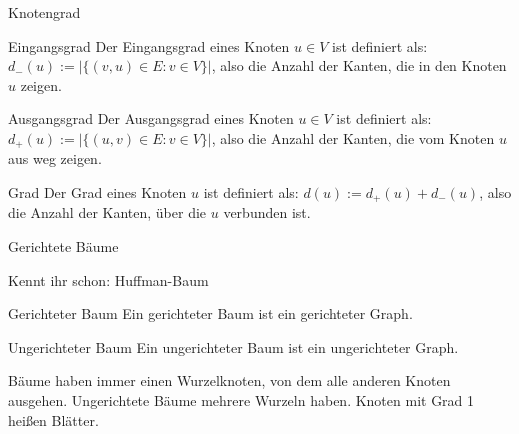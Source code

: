 \begin{frame}{Knotengrad}
	
	
	\begin{block}{Eingangsgrad}
		Der Eingangsgrad eines Knoten $u \in V$ ist definiert als: $d_{-}(u) := |\{(v, u) \in E: v \in V\}|$\ip, also die Anzahl der Kanten, die in den Knoten $u$ zeigen.
	\end{block}

	\bp 

	\begin{block}{Ausgangsgrad}
	Der Ausgangsgrad eines Knoten $u \in V$ ist definiert als: $d_{+}(u) := |\{(u, v) \in E: v \in V\}|$\ip, also die Anzahl der Kanten, die vom Knoten $u$ aus weg zeigen.
	\end{block}

	\bp
	
	\begin{block}{Grad}
		Der Grad eines Knoten $u$ ist definiert als: $d(u) := d_{+}(u) + d_{-}(u)$\ip, also die Anzahl der Kanten, über die $u$ verbunden ist.
	\end{block}
\end{frame}

\begin{frame}{Gerichtete Bäume}
	
	
	\begin{itemize}
		\pitem Kennt ihr schon: Huffman-Baum
	\end{itemize}

	\begin{block}{Gerichteter Baum}
	Ein gerichteter Baum ist ein  gerichteter Graph.	
	\end{block}

	\bp

	\begin{block}{Ungerichteter Baum}
		Ein ungerichteter Baum ist ein  ungerichteter Graph.	
	\end{block}

	\bp

	\begin{itemize}
		\pitem Bäume haben immer einen Wurzelknoten, von dem alle anderen Knoten ausgehen.
		\pitem Ungerichtete Bäume  mehrere Wurzeln haben.
		\pitem Knoten mit Grad 1 heißen Blätter.
	\end{itemize} 
\end{frame}



